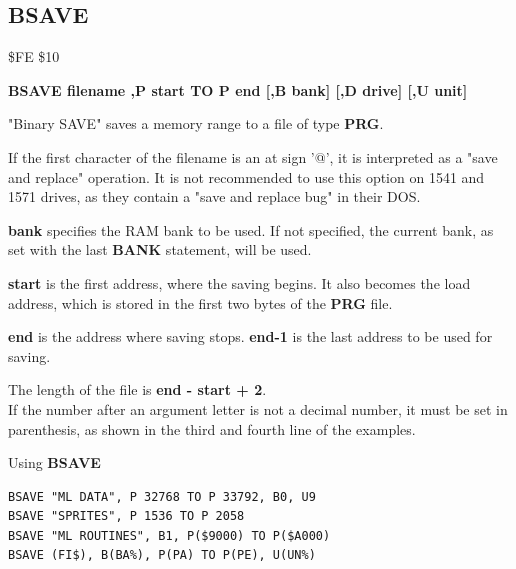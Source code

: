 \subsection{BSAVE}
\begin{description}[leftmargin=2cm,style=nextline]
\item [Token:] \$FE \$10
\item [Format:] {\bf BSAVE filename ,P start TO P end
                [,B bank] [,D drive] [,U unit] }
\item [Usage:]
   "Binary SAVE" saves a memory range to a file of type {\bf PRG}.

   \filenamedefinition
   If the first character of the filename is an at sign '@', it
   is interpreted as a "save and replace" operation. It is not recommended
   to use this option on 1541 and 1571 drives, as they
   contain a "save and replace bug" in their DOS.

   {\bf bank} specifies the RAM bank to be used.
   If not specified, the current bank, as set with the last
   {\bf BANK} statement, will be used.

   {\bf start} is the first address, where the saving begins.
   It also becomes the load address,
   which is stored in the first two bytes of the {\bf PRG} file.

   {\bf end} is the address where saving stops.
   {\bf end-1} is the last address to be used for saving.

   \drivedefinition

   \unitdefinition

\item [Remarks:]
   The length of the file is {\bf end - start + 2}. \\
   If the number after an argument letter is not a decimal
   number, it must be set in parenthesis, as shown
   in the third and fourth line of the examples.


\item [Examples:] Using {\bf BSAVE}
\begin{tcolorbox}[colback=black,coltext=white]
\verbatimfont{\codefont}
\begin{verbatim}
BSAVE "ML DATA", P 32768 TO P 33792, B0, U9
BSAVE "SPRITES", P 1536 TO P 2058
BSAVE "ML ROUTINES", B1, P($9000) TO P($A000)
BSAVE (FI$), B(BA%), P(PA) TO P(PE), U(UN%)
\end{verbatim}
\end{tcolorbox}
\end{description}

